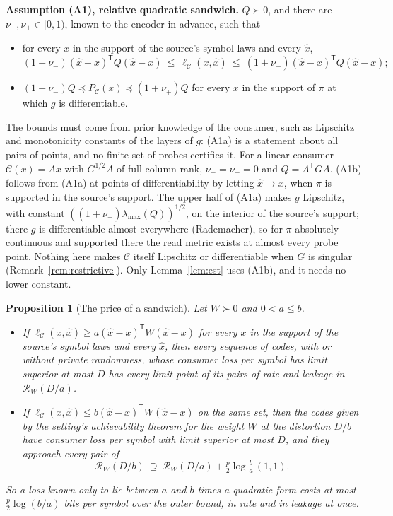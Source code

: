 \documentclass[11pt,onecolumn]{IEEEtran}
\newtheorem{proposition}[theorem]{Proposition}
\newcommand{\PC}{P_{\mathcal C}}
\newcommand{\cR}{\mathcal R}
\newcommand{\nup}{\nu_{+}}
\newcommand{\num}{\nu_{-}}
\newcommand{\lmax}{\lambda_{\max}}
\begin{document}
\textbf{Assumption (A1), relative quadratic sandwich.} $Q\succ0$, and there
are $\num,\nup\in[0,1)$, known to the encoder in advance, such that
\begin{itemize}
\item[(A1a)] for every $x$ in the support of the source's symbol laws and every $\hat x$,
\begin{equation}
(1-\num)(\hat x-x)^{\mathsf T}Q(\hat x-x)\ \le\ \ell_{\mathcal C}(x,\hat x)\ \le\ (1+\nup)(\hat x-x)^{\mathsf T}Q(\hat x-x);
\label{eq:A1}
\end{equation}
\item[(A1b)] $(1-\num)Q\preceq\PC(x)\preceq(1+\nup)Q$ for every $x$ in the support of
$\pi$ at which $g$ is differentiable.
\end{itemize}
The bounds must come from prior knowledge of the consumer, such as Lipschitz
and monotonicity constants of the layers of $g$: (A1a) is a statement about all pairs
of points, and no finite set of probes certifies it. For a linear consumer
$\mathcal C(x)=Ax$ with $G^{1/2}A$ of full column rank, $\num=\nup=0$ and
$Q=A^{\mathsf T}GA$. (A1b) follows from (A1a) at points of differentiability by
letting $\hat x\to x$, when $\pi$ is supported in the source's support. The upper half
of (A1a) makes $g$ Lipschitz, with constant $((1+\nup)\lmax(Q))^{1/2}$, on the
interior of the source's support; there $g$ is differentiable almost everywhere
(Rademacher), so for $\pi$ absolutely continuous and supported there the read metric
exists at almost every probe point. Nothing here makes $\mathcal C$ itself Lipschitz or
differentiable when $G$ is singular (Remark~\ref{rem:restrictive}). Only
Lemma~\ref{lem:est} uses (A1b), and it needs no lower constant.

\begin{proposition}[The price of a sandwich]\label{prop:sand}
Let $W\succ0$ and $0<a\le b$.
\begin{itemize}
\item[(i)] If $\ell_{\mathcal C}(x,\hat x)\ge a(\hat x-x)^{\mathsf T}W(\hat x-x)$ for every $x$
in the support of the source's symbol laws and every $\hat x$, then every sequence of
codes, with or without private randomness, whose consumer loss per symbol has limit
superior at most $D$ has every limit point of its pairs of rate and leakage in
$\cR_W(D/a)$.
\item[(ii)] If $\ell_{\mathcal C}(x,\hat x)\le b(\hat x-x)^{\mathsf T}W(\hat x-x)$ on the same
set, then the codes given by the setting's achievability theorem for the weight $W$
at the distortion $D/b$ have consumer loss per symbol with limit superior at most $D$,
and they approach every pair of
\[
\cR_W(D/b)\ \supseteq\ \cR_W(D/a)+\tfrac p2\log\tfrac ba\,(1,1).
\]
\end{itemize}
So a loss known only to lie between $a$ and $b$ times a quadratic form costs at most
$\tfrac p2\log(b/a)$ bits per symbol over the outer bound, in rate and in leakage at
once.
\end{proposition}
\end{document}
